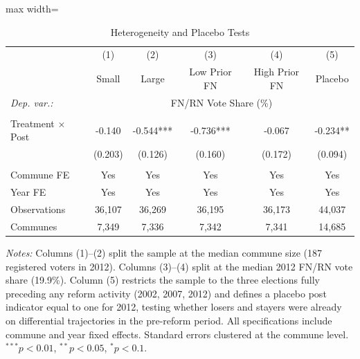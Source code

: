 \begin{table}[htbp]
\centering
\caption{Heterogeneity and Placebo Tests}
\label{tab:heterogeneity}
\begin{adjustbox}{max width=\textwidth}
\begin{tabular}{lccccc}
\toprule
 & (1) & (2) & (3) & (4) & (5) \\
 & Small & Large & Low Prior FN & High Prior FN & Placebo \\
\midrule
\textit{Dep. var.:} & \multicolumn{5}{c}{FN/RN Vote Share (\%)} \\
 & & & & & \\
Treatment $\times$ Post & -0.140 & -0.544*** & -0.736*** & -0.067 & -0.234** \\
 & (0.203) & (0.126) & (0.160) & (0.172) & (0.094) \\
 & & & & & \\
Commune FE & Yes & Yes & Yes & Yes & Yes \\
Year FE & Yes & Yes & Yes & Yes & Yes \\
\midrule
Observations & 36{,}107 & 36{,}269 & 36{,}195 & 36{,}173 & 44{,}037 \\
Communes & 7{,}349 & 7{,}336 & 7{,}342 & 7{,}341 & 14{,}685 \\
\bottomrule
\end{tabular}
\end{adjustbox}
\vspace{0.3em}
\parbox{\textwidth}{\footnotesize
\textit{Notes:} Columns (1)--(2) split the sample at the median commune size (187 registered voters in 2012).
Columns (3)--(4) split at the median 2012 FN/RN vote share (19.9\%).
Column (5) restricts the sample to the three elections fully preceding any reform activity (2002, 2007, 2012) and defines a placebo post indicator equal to one for 2012, testing whether losers and stayers were already on differential trajectories in the pre-reform period.
All specifications include commune and year fixed effects. Standard errors clustered at the commune level.
$^{***}p<0.01$, $^{**}p<0.05$, $^{*}p<0.1$.}
\end{table}
